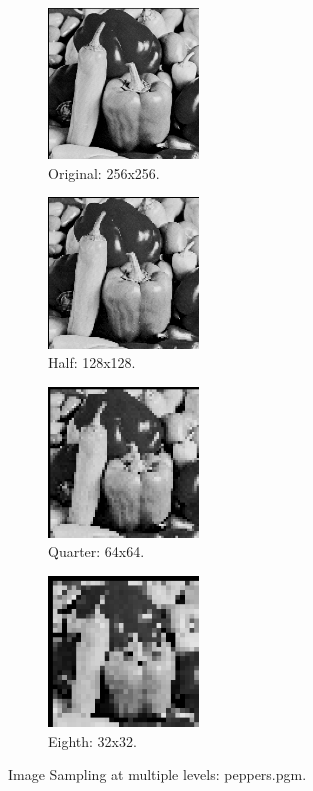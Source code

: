 \documentclass[letterpaper,10pt]{article}
\begin{document}
  \begin{figure}[hbtp]
    \centering
    \begin{subfigure}{4cm}
      \includegraphics[width=4cm]{images/peppers.png}
      \caption{Original: 256x256.}
    \end{subfigure}
    \begin{subfigure}{4cm}
      \includegraphics[width=4cm]{images/peppers_subsample128.png}
      \caption{Half: 128x128.}
    \end{subfigure}
    \begin{subfigure}{4cm}
      \includegraphics[width=4cm]{images/peppers_subsample64.png}
      \caption{Quarter: 64x64.}
    \end{subfigure}
    \begin{subfigure}{4cm}
      \includegraphics[width=4cm]{images/peppers_subsample32.png}
      \caption{Eighth: 32x32.}
    \end{subfigure}
    \caption{Image Sampling at multiple levels: peppers.pgm.}
    \label{fig:samplepeppers}
  \end{figure}
\end{document}
